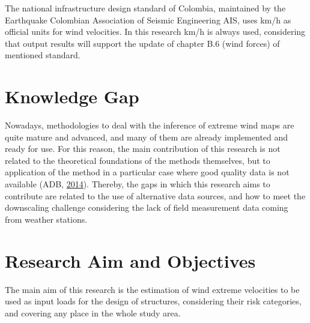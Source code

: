 \documentclass[12pt,twoside]{reedthesis}
\begin{document}
The national infrastructure design standard of Colombia, maintained by the Earthquake Colombian Association of Seismic Engineering AIS, uses km/h as official units for wind velocities. In this research km/h is always used, considering that output results will support the update of chapter B.6 (wind forces) of mentioned standard.

\hypertarget{knowledge-gap}{%
\section{Knowledge Gap}\label{knowledge-gap}}

Nowadays, methodologies to deal with the inference of extreme wind maps are quite mature and advanced, and many of them are already implemented and ready for use. For this reason, the main contribution of this research is not related to the theoretical foundations of the methods themselves, but to application of the method in a particular case where good quality data is not available (ADB, \protect\hyperlink{ref-windassessment}{2014}). Thereby, the gaps in which this research aims to contribute are related to the use of alternative data sources, and how to meet the downscaling challenge considering the lack of field measurement data coming from weather stations.

\hypertarget{research-aim-and-objectives}{%
\section{Research Aim and Objectives}\label{research-aim-and-objectives}}

The main aim of this research is the estimation of wind extreme velocities to be used as input loads for the design of structures, considering their risk categories, and covering any place in the whole study area.
\end{document}
